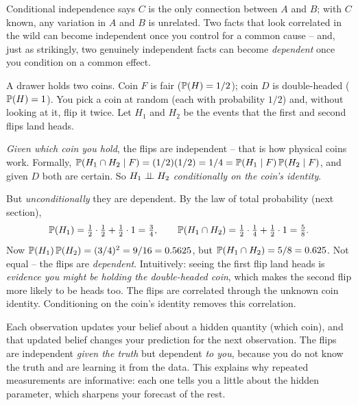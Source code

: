 Conditional independence says $C$ is the only connection between $A$ and $B$; with $C$ known, any variation in $A$ and $B$ is unrelated. Two facts that look correlated in the wild can become independent once you control for a common cause -- and, just as strikingly, two genuinely independent facts can become \emph{dependent} once you condition on a common effect.

\begin{example}
\label{ch04:ex-two-coins-drawer}
A drawer holds two coins. Coin $F$ is fair ($\P(H) = 1/2$); coin $D$ is double-headed ($\P(H) = 1$). You pick a coin at random (each with probability $1/2$) and, without looking at it, flip it twice. Let $H_1$ and $H_2$ be the events that the first and second flips land heads.

\emph{Given which coin you hold}, the flips are independent -- that is how physical coins work. Formally, $\P(H_1 \cap H_2 \given F) = (1/2)(1/2) = 1/4 = \P(H_1\given F)\P(H_2\given F)$, and given $D$ both are certain. So $H_1 \indep H_2$ \emph{conditionally on the coin's identity}.

But \emph{unconditionally} they are dependent. By the law of total probability (next section),
\[
\P(H_1) = \tfrac12\cdot\tfrac12 + \tfrac12\cdot 1 = \tfrac34, \qquad
\P(H_1\cap H_2) = \tfrac12\cdot\tfrac14 + \tfrac12\cdot 1 = \tfrac58.
\]
Now $\P(H_1)\P(H_2) = (3/4)^2 = 9/16 = 0.5625$, but $\P(H_1\cap H_2) = 5/8 = 0.625$. Not equal -- the flips are \emph{dependent}. Intuitively: seeing the first flip land heads is \emph{evidence you might be holding the double-headed coin}, which makes the second flip more likely to be heads too. The flips are correlated through the unknown coin identity. Conditioning on the coin's identity removes this correlation.
\end{example}

\begin{happeningbox}
Each observation updates your belief about a hidden quantity (which coin), and that updated belief changes your prediction for the next observation. The flips are independent \emph{given the truth} but dependent \emph{to you}, because you do not know the truth and are learning it from the data. This explains why repeated measurements are informative: each one tells you a little about the hidden parameter, which sharpens your forecast of the rest.
\end{happeningbox}

